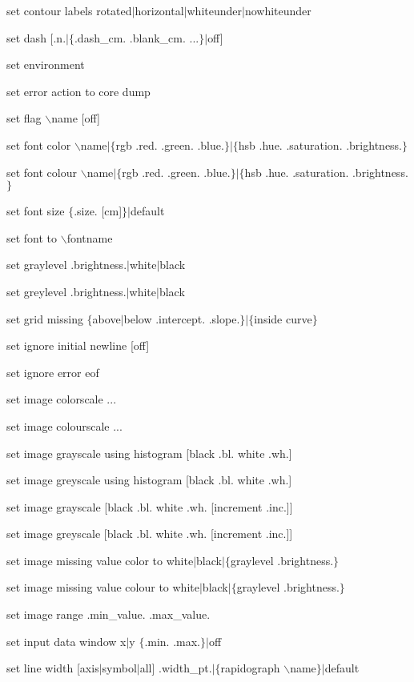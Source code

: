 set contour labels rotated$\mid$horizontal$\mid$whiteunder$\mid$nowhiteunder

set dash [.n.$\mid$$\lbrace$.dash\_cm. .blank\_cm. ...$\rbrace$$\mid$off]

set environment

set error action to core dump

set flag $\backslash$name [off]

set font color $\backslash$name$\mid$$\lbrace$rgb .red. .green. .blue.$\rbrace$$\mid$$\lbrace$hsb .hue. .saturation. .brightness.$\rbrace$

set font colour $\backslash$name$\mid$$\lbrace$rgb .red. .green. .blue.$\rbrace$$\mid$$\lbrace$hsb .hue. .saturation. .brightness.$\rbrace$

set font size $\lbrace$.size. [cm]$\rbrace$$\mid$default

set font to $\backslash$fontname

set graylevel .brightness.$\mid$white$\mid$black

set greylevel .brightness.$\mid$white$\mid$black

set grid missing $\lbrace$above$\mid$below .intercept. .slope.$\rbrace$$\mid$$\lbrace$inside curve$\rbrace$

set ignore initial newline [off]

set ignore error eof

set image colorscale ...

set image colourscale ...

set image grayscale using histogram [black .bl. white .wh.]

set image greyscale using histogram [black .bl. white .wh.]

set image grayscale [black .bl. white .wh. [increment .inc.]]

set image greyscale [black .bl. white .wh. [increment .inc.]]

set image missing value color to white$\mid$black$\mid$$\lbrace$graylevel .brightness.$\rbrace$

set image missing value colour to white$\mid$black$\mid$$\lbrace$graylevel .brightness.$\rbrace$

set image range .min\_value. .max\_value.

set input data window x$\mid$y $\lbrace$.min. .max.$\rbrace$$\mid$off

set line width [axis$\mid$symbol$\mid$all] .width\_pt.$\mid$$\lbrace$rapidograph $\backslash$name$\rbrace$$\mid$default

